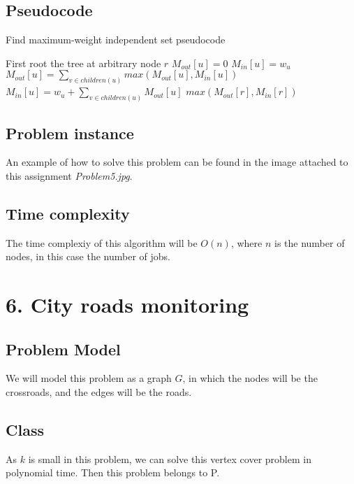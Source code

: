 \documentclass{article}
\begin{document}
\subsection*{Pseudocode}

\begin{algorithm}[H]
\caption{Find maximum-weight independent set pseudocode}
\begin{algorithmic}[1]
\State First root the tree at arbitrary node $r$
  \State $M_{out}[u] = 0$
  \State $M_{in}[u] = w_u$
  \State $M_{out}[u] = \sum_{v\in children(u)}^{} max(M_{out}[u],M_{in}[u])$
  \State $M_{in}[u] = w_u + \sum_{v\in children(u)}^{} M_{out}[u]$
 \EndIf
\EndFor
\Return $max(M_{out}[r],M_{in}[r])$
\end{algorithmic}
\end{algorithm}

\subsection*{Problem instance}

An example of how to solve this problem can be found in the image attached to this assignment \textit{Problem5.jpg}.

\subsection*{Time complexity}

The time complexiy of this algorithm will be $O(n)$, where $n$ is the number of nodes, in this case the number of jobs.

\section*{6. City roads monitoring}

\subsection*{Problem Model}

We will model this problem as a graph $G$, in which the nodes will be the crossroads, and the edges will be the roads.

\subsection*{Class}

As $k$ is small in this problem, we can solve this vertex cover problem in polynomial time. Then this problem belongs to P.
\end{document}
